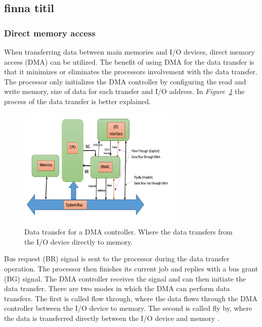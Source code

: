 \subsection{finna titil}

\subsubsection{Direct memory access}

When transferring data between main memories and I/O devices, direct memory access (DMA) can be utilized.
The benefit of using DMA for the data transfer is that it minimizes or eliminates the processors involvement with the data transfer.
The processor only initializes the DMA controller by configuring the read and write memory, size of data for each transfer and I/O address.
In \textit{Figure~\ref{fig:DMAcontroller}} the process of the data transfer is better explained.

\begin{figure}[h]
    \centering
    \includegraphics[width=0.70\textwidth]{graphics/DMA.png}
    \caption{Data transfer for a DMA controller. Where the data transfers from the I/O device directly to memory. \cite{ahmed_design_2019}}
    \label{fig:DMAcontroller}
\end{figure}

Bus request (BR) signal is sent to the processor during the data transfer operation.
The processor then finishes its current job and replies with a bus grant (BG) signal.
The DMA controller receives the signal and can then initiate the data transfer.
There are two modes in which the DMA can perform data transfers.
The first is called flow through, where the data flows through the DMA controller between the I/O device to memory.
The second is called fly by, where the data is transferred directly between the I/O device and memory \cite{ahmed_design_2019}.


